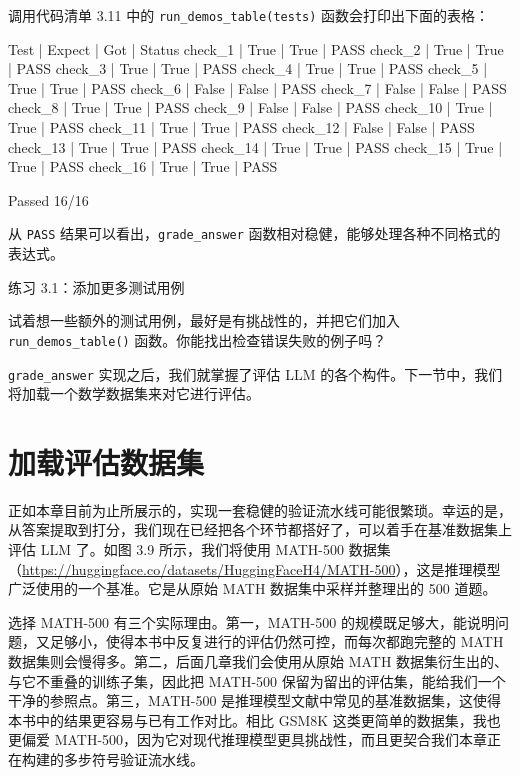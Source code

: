 调用代码清单 3.11 中的 \texttt{run\_demos\_table(tests)} 函数会打印出下面的表格：

\begin{codebox}
Test     | Expect | Got   | Status
check_1  | True   | True  | PASS
check_2  | True   | True  | PASS
check_3  | True   | True  | PASS
check_4  | True   | True  | PASS
check_5  | True   | True  | PASS
check_6  | False  | False | PASS
check_7  | False  | False | PASS
check_8  | True   | True  | PASS
check_9  | False  | False | PASS
check_10 | True   | True  | PASS
check_11 | True   | True  | PASS
check_12 | False  | False | PASS
check_13 | True   | True  | PASS
check_14 | True   | True  | PASS
check_15 | True   | True  | PASS
check_16 | True   | True  | PASS

Passed 16/16
\end{codebox}

从 \texttt{PASS} 结果可以看出，\texttt{grade\_answer} 函数相对稳健，能够处理各种不同格式的表达式。

\begin{mySidebar}{练习 3.1：添加更多测试用例}

试着想一些额外的测试用例，最好是有挑战性的，并把它们加入 \texttt{run\_demos\_table()} 函数。你能找出检查错误失败的例子吗？

\end{mySidebar}

\texttt{grade\_answer} 实现之后，我们就掌握了评估 LLM 的各个构件。下一节中，我们将加载一个数学数据集来对它进行评估。

\section{加载评估数据集}

正如本章目前为止所展示的，实现一套稳健的验证流水线可能很繁琐。幸运的是，从答案提取到打分，我们现在已经把各个环节都搭好了，可以着手在基准数据集上评估 LLM 了。如图 3.9 所示，我们将使用 MATH-500 数据集（\href{https://huggingface.co/datasets/HuggingFaceH4/MATH-500}{https://huggingface.co/datasets/HuggingFaceH4/MATH-500}），这是推理模型广泛使用的一个基准。它是从原始 MATH 数据集中采样并整理出的 500 道题。


选择 MATH-500 有三个实际理由。第一，MATH-500 的规模既足够大，能说明问题，又足够小，使得本书中反复进行的评估仍然可控，而每次都跑完整的 MATH 数据集则会慢得多。第二，后面几章我们会使用从原始 MATH 数据集衍生出的、与它不重叠的训练子集，因此把 MATH-500 保留为留出的评估集，能给我们一个干净的参照点。第三，MATH-500 是推理模型文献中常见的基准数据集，这使得本书中的结果更容易与已有工作对比。相比 GSM8K 这类更简单的数据集，我也更偏爱 MATH-500，因为它对现代推理模型更具挑战性，而且更契合我们本章正在构建的多步符号验证流水线。

